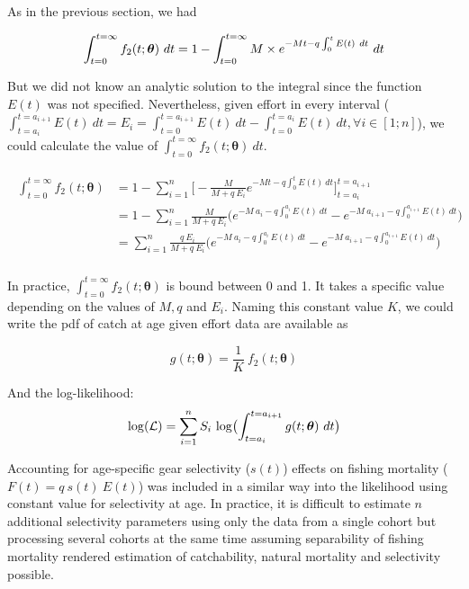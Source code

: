 \documentclass[12pt]{article}
\begin{document}
As in the previous section, we had

\begin{equation}
\int_{t=0}^{t=\infty} f_{2}(t; \bm{\theta}) \ dt = 1 - \int_{t=0}^{t=\infty} M \times e^{-Mt-q\int_{0}^{t}E(t) \ dt} \ dt \\
\end{equation}

But we did not know an analytic solution to the integral since the function $E(t)$ was not specified. Nevertheless, given effort in every interval ($\int_{t=a_{i}}^{t=a_{i+1}}  E(t) \ dt = E_{i} = \int_{t=0}^{t=a_{i+1}} E(t) \ dt - \int_{t=0}^{t=a_{i}} E(t) \ dt, \forall i \in [1; n]$), we could calculate the value of $\int_{t=0}^{t=\infty} f_{2}(t; \bm{\theta}) \ dt$. %

\begin{align}
\begin{split}
\int_{t=0}^{t=\infty} f_{2}(t; \bm{\theta}) &= 1 - \sum_{i=1}^{n} \bigl [ -\frac{M}{M+q \ E_{i}} e^{-Mt-q\int_{0}^{t}E(t) \ dt} \bigr ]_{t=a_{i}}^{t=a_{i+1}} \\
                                   &= 1 - \sum_{i=1}^{n} \frac{M}{M+q \ E_{i}} \bigl ( e^{-M \ a_{i}-q \int_{0}^{a_{i}}E(t) \ dt} - e^{-M \ a_{i+1}-q \int_{0}^{a_{i+1}} E(t) \ dt} \bigr ) \\
                                   &= \sum_{i=1}^{n} \frac{q \ E_{i}}{M+q \ E_{i}} \bigl ( e^{-M \ a_{i}-q\int_{0}^{a_{i}}E(t) \ dt} - e^{-M \ a_{i+1}-q\int_{0}^{a_{i+1}}E(t) \ dt} \bigr ) \\
\end{split}
\end{align}

In practice, $\int_{t=0}^{t=\infty} f_{2}(t; \bm{\theta})$ is bound between 0 and 1. It takes a specific value depending on the values of $M, q $ and $E_{i}$. Naming this constant value $K$, we could write the pdf of catch at age given effort data are available as

\begin{equation}
g(t; \bm{\theta}) = \frac{1}{K} \ f_{2}(t; \bm{\theta})
\end{equation}

And the log-likelihood:
\begin{equation}
{\rm log}(\mathcal{L}) = \sum_{i=1}^{n} S_{i} \ {\rm log} \bigl ( \int_{t=a_{i}}^{t=a_{i+1}} g(t; \bm{\theta}) \ dt \bigr )
\end{equation}

Accounting for age-specific gear selectivity ($s(t)$) effects on fishing mortality ($F(t) = q \ s(t) \ E(t)$) was included in a similar way into the likelihood using constant value for selectivity at age. In practice, it is difficult to estimate $n$ additional selectivity parameters using only the data from a single cohort but processing several cohorts at the same time assuming separability of fishing mortality rendered estimation of catchability, natural mortality and selectivity possible.
\end{document}
